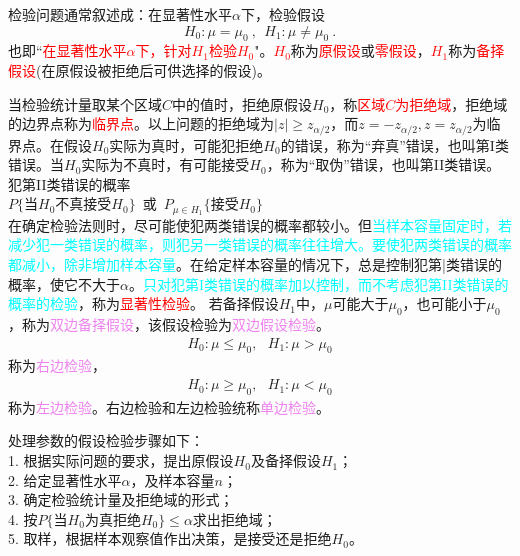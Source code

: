\documentclass[12pt,a4paper]{article}
\begin{document}
检验问题通常叙述成：在显著性水平$\alpha$下，检验假设
\begin{equation}
H_0 : \mu = \mu_0 ~, ~~ H_1 : \mu \neq \mu_0 ~.
\end{equation}
也即``\textcolor{red}{在显著性水平$\alpha$下，针对$H_1$检验$H_0$}"。\textcolor{red}{$H_0$}称为\textcolor{red}{原假设}或\textcolor{red}{零假设}，\textcolor{red}{$H_1$}称为\textcolor{red}{备择假设}(在原假设被拒绝后可供选择的假设)。

当检验统计量取某个区域$C$中的值时，拒绝原假设$H_0$，称\textcolor{red}{区域$C$为拒绝域}，拒绝域的边界点称为\textcolor{red}{临界点}。以上问题的拒绝域为$|z| \geqslant z_{\alpha/2}$，而$z=-z_{\alpha/2}, z=z_{\alpha/2}$为临界点。在假设$H_0$实际为真时，可能犯拒绝$H_0$的错误，称为“弃真”错误，也叫第I类错误。当$H_0$实际为不真时，有可能接受$H_0$，称为“取伪”错误，也叫第II类错误。犯第II类错误的概率 \\
$P\{$当$H_0$不真接受$H_0 \}$~或~$P_{\mu \in H_1}\{$接受$H_0\}$ \\
在确定检验法则时，尽可能使犯两类错误的概率都较小。但\textcolor{cyan}{当样本容量固定时，若减少犯一类错误的概率，则犯另一类错误的概率往往增大。要使犯两类错误的概率都减小，除非增加样本容量}。在给定样本容量的情况下，总是控制犯第|类错误的概率，使它不大于$\alpha$。\textcolor{cyan}{只对犯第I类错误的概率加以控制，而不考虑犯第II类错误的概率的检验}，称为\textcolor{red}{显著性检验}。
若备择假设$H_1$中，$\mu$可能大于$\mu_0$，也可能小于$\mu_0$，称为\textcolor{violet}{双边备择假设}，该假设检验为\textcolor{violet}{双边假设检验}。
\begin{eqnarray*}
H_0 : \mu \leqslant \mu_0 ,~~~ H_1 : \mu > \mu_0
\end{eqnarray*}
称为\textcolor{violet}{右边检验}，
\begin{eqnarray*}
H_0 : \mu \geqslant \mu_0 ,~~~ H_1 : \mu < \mu_0
\end{eqnarray*}
称为\textcolor{violet}{左边检验}。右边检验和左边检验统称\textcolor{violet}{单边检验}。



处理参数的假设检验步骤如下：\\
1. 根据实际问题的要求，提出原假设$H_0$及备择假设$H_1$；\\
2. 给定显著性水平$\alpha$，及样本容量$n$；\\
3. 确定检验统计量及拒绝域的形式；\\
4. 按$P\{$当$H_0$为真拒绝$H_0\} \leqslant \alpha$求出拒绝域；\\
5. 取样，根据样本观察值作出决策，是接受还是拒绝$H_0$。
\end{document}
